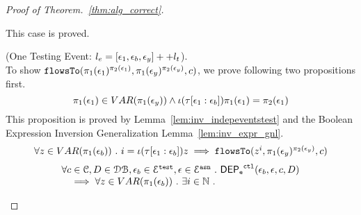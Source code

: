 \begin{proof}[Proof of Theorem.~\ref{thm:alg_correct}]
\begin{case}
\begin{subcase}
\begin{subsubcase}
\begin{subproof}
\end{subproof}
%
%
This case is proved.
%
\end{subsubcase}
%
\end{subcase}
%
%
\begin{subcase}
  \label{case:flowsto_1test}
  (One Testing Event: $l_e = {[\mathtt{\epsilon}_1, \mathtt{\epsilon}_b, \mathtt{\epsilon}_y]} ++ l_t$).
\\
To show $\mathtt{flowsTo}(\pi_1(\mathtt{\epsilon}_1)^{\pi_2(\mathtt{\epsilon}_1)}, \pi_1(\mathtt{\epsilon}_y)^{\pi_2(\mathtt{\epsilon}_y)}, c) $,
we prove following two propositions first.
\[
  \pi_1(\mathtt{\epsilon}_1) \in VAR(\pi_1(\mathtt{\epsilon}_y)) \land \iota(\mathtt{\tau}[\mathtt{\epsilon}_1:\mathtt{\epsilon}_b]) \pi_1(\mathtt{\epsilon}_1) = \pi_2(\mathtt{\epsilon}_1)
\]
This proposition is proved by Lemma~\ref{lem:inv_indepeventstest} and the Boolean Expression Inversion Generalization Lemma~\ref{lem:inv_expr_gnl}.
%
  \begin{equation}
  \begin{array}{l}
    \forall z \in VAR(\pi_1(\mathtt{\epsilon}_b)) ~.~ i = \iota(\mathtt{\tau}[\mathtt{\epsilon}_1:\mathtt{\epsilon}_b]) z \implies
    \mathtt{flowsTo}(z^i, \pi_1(\mathtt{\epsilon}_y)^{\pi_2(\mathtt{\epsilon}_y)}, c)
  \end{array}
  \end{equation}
%
\[
  \begin{array}{l}
  \forall c \in \mathcal{C}, D \in \mathcal{DB}, \mathtt{\epsilon}_b \in \mathcal{E}^{\mathtt{{test}}}, \mathtt{\epsilon} \in \mathcal{E}^{\mathtt{{asn}}} ~.~ 
  \mathsf{DEP_{\mathtt{e}}}^{\mathtt{{ctl}}}(\mathtt{\epsilon}_b, \mathtt{\epsilon}, c, D) 
  \\ \quad 
  \implies
  \forall z \in VAR(\pi_1(\mathtt{\epsilon}_b)) ~.~ \exists i \in \mathbb{N} ~.~

\end{array}\]
\end{subcase}
\end{case}
\end{proof}
